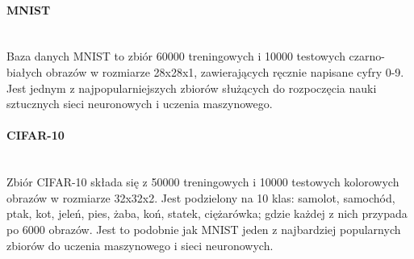 \paragraph{MNIST} \mbox{}\\
Baza danych MNIST \cite{MNIST} to zbiór 60000 treningowych i 10000 testowych czarno-białych obrazów
w rozmiarze 28x28x1, zawierających ręcznie napisane cyfry 0-9. Jest jednym z
najpopularniejszych zbiorów służących do rozpoczęcia nauki sztucznych sieci neuronowych
i uczenia maszynowego.

\paragraph{CIFAR-10} \mbox{}\\
Zbiór CIFAR-10 \cite{CIFAR-10} składa się z 50000 treningowych i 10000 testowych kolorowych obrazów w rozmiarze
32x32x2. Jest podzielony na 10 klas: samolot, samochód, ptak, kot, jeleń, pies, żaba,
koń, statek, ciężarówka; gdzie każdej z nich przypada po 6000 obrazów. Jest to podobnie
jak MNIST jeden z najbardziej popularnych zbiorów do uczenia maszynowego i sieci neuronowych.
